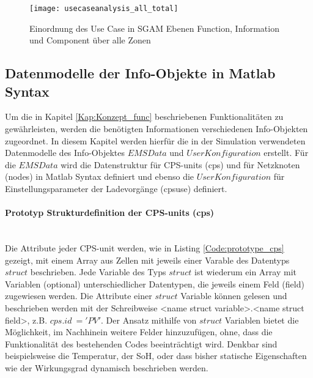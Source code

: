 			\begin{figure}[h] %
				\centering
				\texttt{[image: usecaseanalysis\_all\_total]}
				\caption{Einordnung des Use Case in SGAM Ebenen Function, Information und Component über alle Zonen}
				\label{Abb:SGAM_map_all_total}
			\end{figure} 
					
		\subsection{Datenmodelle der Info-Objekte in Matlab Syntax}
			Um die in Kapitel \ref{Kap:Konzept_func} beschriebenen Funktionalitäten zu gewährleisten, werden die benötigten Informationen verschiedenen Info-Objekten zugeordnet. In diesem Kapitel werden hierfür die in der Simulation verwendeten Datenmodelle des Info-Objektes $EMS Data$ und $User Konfiguration$ erstellt. Für die $EMS Data$ wird die Datenstruktur für CPS-units (cps) und für Netzknoten (nodes) in Matlab Syntax definiert und ebenso die $User Konfiguration$ für Einstellungsparameter der Ladevorgänge (cpsuse) definiert. \\

			\paragraph{Prototyp Strukturdefinition der CPS-units (cps)}~ \\
			Die Attribute jeder CPS-unit werden, wie in Listing \ref{Code:prototype_cps} gezeigt, mit einem Array aus Zellen mit jeweils einer Varable des Datentyps $struct$ beschrieben. Jede Variable des Typs $struct$ ist wiederum ein Array mit Variablen (optional) unterschiedlicher Datentypen, die jeweils einem Feld (field) zugewiesen werden. Die Attribute einer $struct$ Variable können gelesen und beschrieben werden mit der Schreibweise <name struct variable>.<name struct field>, z.B. $cps.id~ = 'PV'$. Der Ansatz mithilfe von $struct$ Variablen bietet die Möglichkeit, im Nachhinein weitere Felder hinzuzufügen, ohne, dass die Funktionalität des bestehenden Codes beeinträchtigt wird. Denkbar sind beispielsweise die Temperatur, der SoH, oder dass bisher statische Eigenschaften wie der Wirkungsgrad dynamisch beschrieben werden. \\
            

